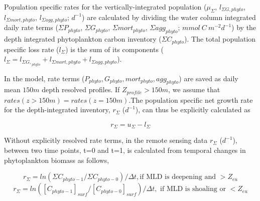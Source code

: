 
Population specific rates for the vertically-integrated population ($ \mu_{\Sigma}$, $l_{\Sigma G,phyto}$, $l_{\Sigma mort,phyto}$, $l_{\Sigma agg,phyto}$; $d^{-1}$) are calculated by dividing the water column integrated daily rate terms ($\Sigma P_{phyto}$, $\Sigma G_{phyto}$, $\Sigma mort_{phyto}$, $\Sigma agg_{phyto}$; $mmol \: C \: m^{-2} d^{-1}$) by the depth integrated phytoplankton carbon inventory ($\Sigma C_{phyto}$). The total population specific loss rate ($l_{\Sigma}$) is the sum of its components ($l_{\Sigma} = l_{\Sigma G,}_{phyto} + l_{\Sigma mort,phyto} + l_{\Sigma agg,phyto} $).

In the model, rate terms ($P_{phyto},G_{phyto},mort_{phyto},agg_{phyto}$) are saved as daily mean $150m$ depth resolved profiles. If $Z_{profile}>150m$, we assume that $rates(z>150m) = rates(z=150m)$.The population specific net growth rate for the depth-integrated inventory, $r_{\Sigma}$  ($d^{-1}$), can thus be explicitly calculated as

\begin{equation}
    r_{\Sigma} = u_{\Sigma} - l_{\Sigma}
\end{equation}

Without explicitly resolved rate terms, in the remote sensing data $r_{\Sigma}$  ($d^{-1}$), between two time points, t=0 and t=1, is calculated from temporal changes in phytoplankton biomass as follows,

\begin{equation}
    r_{\Sigma} = ln (\Sigma C_{phyto-1}/\Sigma C_{phyto-0})/\Delta t, \textrm{if MLD is deepening and }> Z_{eu}
\end{equation}
\begin{equation}
    r_{\Sigma} = ln ([C_{phyto-1}]_{surf}/[C_{phyto-0}]_{surf})/\Delta t, \textrm{ if MLD is shoaling or }< Z_{eu}
\end{equation}

